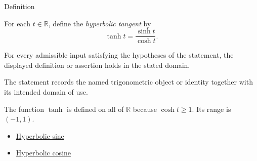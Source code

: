 

\begin{definitionbox}{Definition}
\begin{definition}
\label{def:hyperbolic-tangent}
For each $t\in\mathbb{R}$, define the \emph{hyperbolic tangent} by
\[
  \tanh t=\frac{\sinh t}{\cosh t}.
\]
\end{definition}
\end{definitionbox}
\begin{remark*}
For every admissible input satisfying the hypotheses of the statement, the
displayed definition or assertion holds in the stated domain.
\end{remark*}

\begin{remark*}[Interpretation]
The statement records the named trigonometric object or identity together with
its intended domain of use.
\end{remark*}

\begin{remark*}
The function $\tanh$ is defined on all of $\mathbb{R}$ because
$\cosh t\geq 1$. Its range is $(-1,1)$.
\end{remark*}
\begin{dependencies}
\begin{itemize}
  \item \hyperref[def:hyperbolic-sine]{Hyperbolic sine}
  \item \hyperref[def:hyperbolic-cosine]{Hyperbolic cosine}
\end{itemize}
\end{dependencies}
